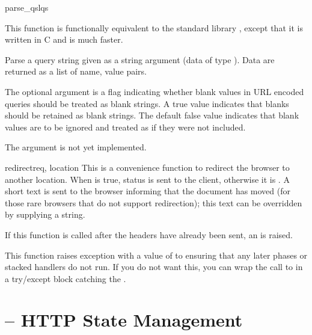 \begin{funcdesc}{parse_qsl}{qs}

  This function is functionally equivalent to the standard library
   , except that it is written in C and is
  much faster. 

  Parse a query string given as a string argument (data of type
  ).  Data are
  returned as a list of name, value pairs.

  The optional argument  is a flag indicating
  whether blank values in URL encoded queries should be treated as blank
  strings.  A true value indicates that blanks should be retained as
  blank strings.  The default false value indicates that blank values
  are to be ignored and treated as if they were not included.

  \begin{notice}
    The  argument is not yet implemented.
  \end{notice}

\end{funcdesc}

\begin{funcdesc}{redirect}{req, location}
  This is a convenience function to redirect the browser to another
  location. When  is true, 
  status is sent to the client, otherwise it is
  . A short text is sent to the browser
  informing that the document has moved (for those rare browsers that
  do not support redirection); this text can be overridden by
  supplying a  string.

  If this function is called after the headers have already been sent,
  an  is raised.

  This function raises  exception with
  a value of  to ensuring that any later phases or
  stacked handlers do not run. If you do not want this, you can wrap the
  call to  in a try/except block catching the
  .
\end{funcdesc}

\section{ -- HTTP State Management\label{pyapi-cookie}}

